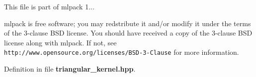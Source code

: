 This file is part of mlpack 1...

mlpack is free software; you may redstribute it and/or modify it under the terms of the 3-\/clause B\-S\-D license. You should have received a copy of the 3-\/clause B\-S\-D license along with mlpack. If not, see {\tt http\-://www.\-opensource.\-org/licenses/\-B\-S\-D-\/3-\/\-Clause} for more information. 

Definition in file {\bf triangular\-\_\-kernel.\-hpp}.

